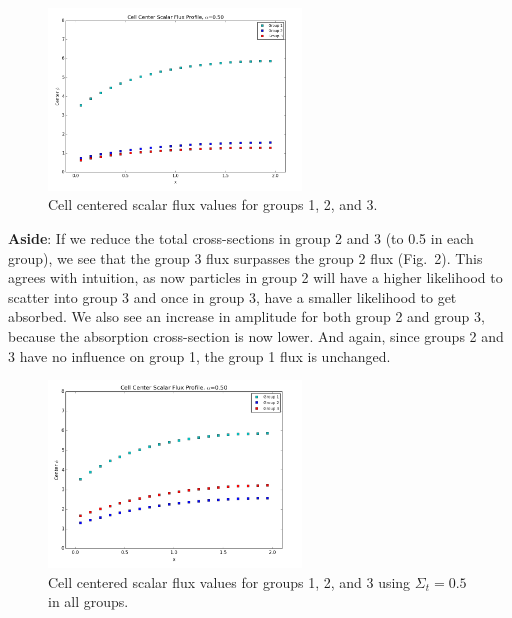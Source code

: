 \documentclass[10pt]{article}
\begin{document}
\begin{figure}[H]
\centering
\includegraphics[width=0.6\textwidth]{Figures/groupcenterfluxes.png}
\vspace{-7pt}
\caption{Cell centered scalar flux values for groups 1, 2, and 3.}
\end{figure}

\textbf{Aside}: If we reduce the total cross-sections in group 2 and 3 (to 0.5 in each group), we see that the group 3 flux surpasses the group 2 flux (Fig.~2). This agrees with intuition, as now particles in group 2 will have a higher likelihood to scatter into group 3 and once in group 3, have a smaller likelihood to get absorbed. We also see an increase in amplitude for both group 2 and group 3, because the absorption cross-section is now lower. And again, since groups 2 and 3 have no influence on group 1, the group 1 flux is unchanged.

\begin{figure}[htb!]
\centering
\includegraphics[width=0.6\textwidth]{Figures/groupcenterfluxes_lowertotxsection.png}
\vspace{-7pt}
\caption{Cell centered scalar flux values for groups 1, 2, and 3 using $\Sigma_t = 0.5$ in all groups.}
\end{figure}
\end{document}

